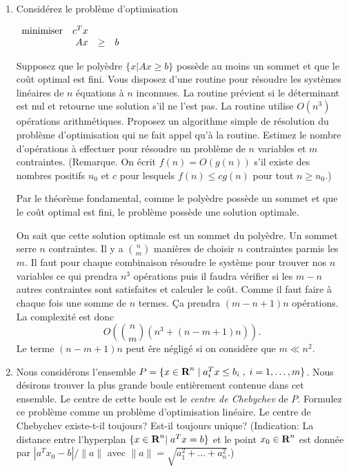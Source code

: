 \begin{enumerate}
  \item     Considérez le problème d'optimisation

    $
    \begin{array}{lrcr}
      \mbox{minimiser} & c^T x \\
      & Ax & \geq & b
    \end{array}
    $

    Supposez que le poly\`edre $\{x |  Ax \geq b \}$  possède au moins un sommet et que le coût optimal est fini. Vous disposez d'une routine pour résoudre les
    systèmes linéaires de $n$ équations à $n$ inconnues. La routine prévient si le déterminant est nul et retourne une solution s'il ne l'est pas. La routine
    utilise
    $O(n^3)$ opérations arithmétiques.  Proposez un algorithme
    simple de résolution du problème d'optimisation qui ne fait appel qu'à la routine. Estimez le nombre d'opérations à effectuer pour résoudre un
    problème de
    $n$ variables et $m$ contraintes. (Remarque. On écrit $f(n)=O(g(n))$ s'il existe des nombres positifs $n_0$ et $c$ pour lesquels $f(n) \leq cg(n)$ pour tout
    $n \geq n_0$.)


    \begin{solution}
      Par le théorème fondamental, comme le polyèdre possède un sommet
      et que le coût optimal est fini, le problème possède
      une solution optimale.

      On sait que cette solution optimale est un sommet du polyèdre.
      Un sommet serre $n$ contraintes. Il y a ${n \choose m}$
      manières de choisir $n$ contraintes parmis les $m$.
      Il faut pour chaque combinaison résoudre le système pour trouver
      nos $n$ variables ce qui prendra $n^3$ opérations puis il faudra
      vérifier si les $m-n$ autres contraintes sont satisfaites et
      calculer le coût.
      Comme il faut faire à chaque fois une somme de $n$ termes.
      Ça prendra $(m-n+1)n$ opérations.
      La complexité est donc
      \[ O\left({n \choose m}(n^3 + (n-m+1)n)\right). \]
      Le terme $(n-m+1)n$ peut êre négligé si on considère que $m \ll n^2$.
    \end{solution}

  \item Nous considérons l'ensemble $P=\{ x \in {\mbox{\bf R}}^n \; | \; a_i^T x \leq b_i \; , \;  i=1, \ldots, m \}$. Nous désirons trouver la
    plus grande boule entièrement contenue dans cet ensemble. Le centre de cette boule est  le {\it centre de Chebychev} de $P$.  Formulez
    ce problème comme un problème d'optimisation linéaire. Le centre de Chebychev
    existe-t-il toujours? Est-il toujours unique? (Indication:  La distance entre l'hyperplan $\{x \in {\mbox{\bf R}}^n | \;  a^Tx=b \}$ et le point $x_0 \in {\mbox{\bf R}}^n$
    est donnée par
    $|a^Tx_0 - b|/\|a\|$ avec $\|a\|=\sqrt{a_1^2+ \ldots + a_n^2}$.)




\end{enumerate}
